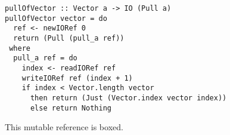 \begin{lstlisting}
pullOfVector :: Vector a -> IO (Pull a)
pullOfVector vector = do
  ref <- newIORef 0
  return (Pull (pull_a ref))
 where
  pull_a ref = do
    index <- readIORef ref
    writeIORef ref (index + 1)
    if index < Vector.length vector
      then return (Just (Vector.index vector index))
      else return Nothing
\end{lstlisting}

This mutable reference is boxed. 



% 
% 
% 
% 
% 
% 
